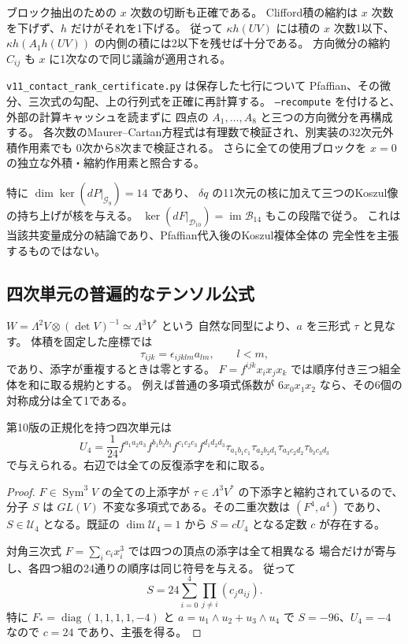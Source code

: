 ブロック抽出のための $x$ 次数の切断も正確である。
Clifford積の縮約は $x$ 次数を下げず、$h$ だけがそれを1下げる。
従って $\kappa h(UV)$ には積の $x$ 次数1以下、
$\kappa h(A_1h(UV))$ の内側の積には2以下を残せば十分である。
方向微分の縮約 $C_{ij}$ も $x$ に1次なので同じ議論が適用される。

\texttt{v11\_contact\_rank\_certificate.py} は保存した七行について
Pfaffian、その微分、三次式の勾配、上の行列式を正確に再計算する。
\texttt{--recompute} を付けると、外部の計算キャッシュを読まずに
四点の $A_1,\ldots,A_8$ と三つの方向微分を再構成する。
各次数のMaurer--Cartan方程式は有理数で検証され、別実装の32次元外積作用素でも
0次から8次まで検証される。
さらに全ての使用ブロックを $x=0$ の独立な外積・縮約作用素と照合する。


特に $\dim\ker(dP|_{\mathcal G_9})=14$ であり、
$\delta q$ の11次元の核に加えて三つのKoszul像の持ち上げが核を与える。
$\ker(dF|_{\mathcal D_{10}})=\operatorname{im}\mathcal B_{14}$ もこの段階で従う。
これは当該共変量成分の結論であり、Pfaffian代入後のKoszul複体全体の
完全性を主張するものではない。

\subsection{四次単元の普遍的なテンソル公式}
\label{subsec:v11-tetrahedral-U4}

$W=\Lambda^2V\otimes(\det V)^{-1}\simeq\Lambda^3V^*$ という
自然な同型により、$a$ を三形式 $\tau$ と見なす。
体積を固定した座標では
\[
 \tau_{ijk}=\epsilon_{ijklm}a_{lm},\qquad l<m,
\]
であり、添字が重複するときは零とする。
$F=f^{ijk}x_ix_jx_k$ では順序付き三つ組全体を和に取る規約とする。
例えば普通の多項式係数が $6x_0x_1x_2$ なら、その6個の対称成分は全て1である。

\begin{proposition}[四面体縮約による $U_4$]
\label{prop:v11-tetrahedral-U4}
第10版の正規化を持つ四次単元は
\[
 U_4=\frac1{24}
 f^{a_1a_2a_3}f^{b_1b_2b_3}f^{c_1c_2c_3}f^{d_1d_2d_3}
 \tau_{a_1b_1c_1}\tau_{a_2b_2d_1}
 \tau_{a_3c_2d_2}\tau_{b_3c_3d_3}
\]
で与えられる。右辺では全ての反復添字を和に取る。
\end{proposition}
\begin{proof}
$F\in\operatorname{Sym}^3V$ の全ての上添字が
$\tau\in\Lambda^3V^*$ の下添字と縮約されているので、分子 $S$ は
$GL(V)$ 不変な多項式である。その二重次数は $(F^4,a^4)$ であり、
$S\in\mathcal U_4$ となる。既証の $\dim\mathcal U_4=1$ から
$S=cU_4$ となる定数 $c$ が存在する。

対角三次式 $F=\sum_i c_i x_i^3$ では四つの頂点の添字は全て相異なる
場合だけが寄与し、各四つ組の24通りの順序は同じ符号を与える。
従って
\[
 S=24\sum_{i=0}^4\prod_{j\ne i}(c_j a_{ij}).
\]
特に $F_*=\operatorname{diag}(1,1,1,1,-4)$ と
$a=u_1\wedge u_2+u_3\wedge u_4$ で $S=-96$、$U_4=-4$ なので
$c=24$ であり、主張を得る。
\end{proof}

